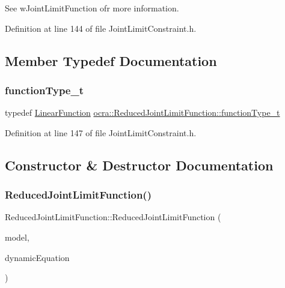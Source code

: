See w\+Joint\+Limit\+Function ofr more information. 

Definition at line 144 of file Joint\+Limit\+Constraint.\+h.



\subsection{Member Typedef Documentation}
\hypertarget{classocra_1_1ReducedJointLimitFunction_a899e4871502f5e5509349b1f8eb5dfa8}{}\label{classocra_1_1ReducedJointLimitFunction_a899e4871502f5e5509349b1f8eb5dfa8} 
\subsubsection{\texorpdfstring{function\+Type\+\_\+t}{functionType\_t}}
{\footnotesize\ttfamily typedef \hyperlink{classocra_1_1LinearFunction}{Linear\+Function} \hyperlink{classocra_1_1ReducedJointLimitFunction_a899e4871502f5e5509349b1f8eb5dfa8}{ocra\+::\+Reduced\+Joint\+Limit\+Function\+::function\+Type\+\_\+t}}



Definition at line 147 of file Joint\+Limit\+Constraint.\+h.



\subsection{Constructor \& Destructor Documentation}
\hypertarget{classocra_1_1ReducedJointLimitFunction_afe65f4b9229680de647bb06fd7ae5b44}{}\label{classocra_1_1ReducedJointLimitFunction_afe65f4b9229680de647bb06fd7ae5b44} 
\subsubsection{\texorpdfstring{Reduced\+Joint\+Limit\+Function()}{ReducedJointLimitFunction()}}
{\footnotesize\ttfamily Reduced\+Joint\+Limit\+Function\+::\+Reduced\+Joint\+Limit\+Function (\begin{DoxyParamCaption}\item[{const \hyperlink{classocra_1_1Model}{Model} \&}]{model,  }\item[{const \hyperlink{classocra_1_1FullDynamicEquationFunction}{Full\+Dynamic\+Equation\+Function} \&}]{dynamic\+Equation }\end{DoxyParamCaption})}

